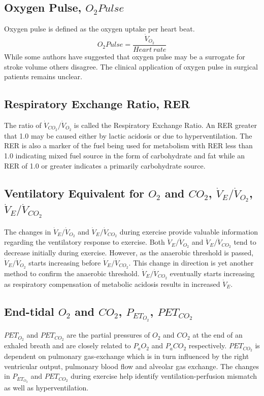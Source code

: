\subsection{Oxygen Pulse, $O_2Pulse$}
Oxygen pulse is defined as the oxygen uptake per heart beat.
\begin{equation} \label{eq:oxygen_pulse}
	O_2Pulse = \frac{\dot{V}_{O_2}}{Heart\ rate}
\end{equation}
While some authors have suggested that oxygen pulse may be a surrogate for stroke volume others disagree. The clinical application of oxygen pulse in surgical patients remains unclear.

\subsection{Respiratory Exchange Ratio, RER}
The ratio of $\dot{V}_{CO_2}/\dot{V}_{O_2}$ is called the Respiratory Exchange Ratio. An RER greater that 1.0 may be caused either by lactic acidosis or due to hyperventilation. The RER is also a marker of the fuel being used for metabolism with RER less than 1.0 indicating mixed fuel source in the form of carbohydrate and fat while an RER of 1.0 or greater indicates a primarily carbohydrate source.

\subsection{Ventilatory Equivalent for $O_2$ and $CO_2$, $\dot{V}_E/\dot{V}_{O_2}$, $\dot{V}_E/\dot{V}_{CO_2}$}
The changes in $\dot{V}_E/\dot{V}_{O_2}$ and $\dot{V}_E/\dot{V}_{CO_2}$ during exercise provide valuable information regarding the ventilatory response to exercise. Both $\dot{V}_E/\dot{V}_{O_2}$ and $\dot{V}_E/\dot{V}_{CO_2}$ tend to decrease initially during exercise. However, as the anaerobic threshold is passed, $\dot{V}_E/\dot{V}_{O_2}$ starts increasing before $\dot{V}_E/\dot{V}_{CO_2}$. This change in direction is yet another method to confirm the anaerobic threshold.  $\dot{V}_E/\dot{V}_{CO_2}$ eventually starts increasing as respiratory compensation of metabolic acidosis results in increased $\dot{V}_E$.

\subsection{End-tidal $O_2$ and $CO_2$, $P_{ET_{O_2}}$, $P{ET_{CO_2}}$}
$PET_{O_2}$ and $PET_{CO_2}$ are the partial pressures of $O_2$ and $CO_2$ at the end of an exhaled breath and are closely related to $P_aO_2$ and $P_aCO_2$ respectively. $P{ET_{CO_2}}$ is dependent on pulmonary gas-exchange which is in turn influenced by the right ventricular output, pulmonary blood flow and alveolar gas exchange. The changes in $P_{ET_{O_2}}$ and $P{ET_{CO_2}}$ during exercise help identify ventilation-perfusion mismatch as well as hyperventilation.

